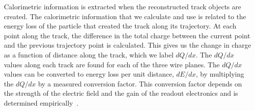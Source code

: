     Calorimetric information is extracted when the reconstructed track objects
    are created. The calorimetric information that we calculate and use is
    related to the energy loss of the particle that created the track along its
    trajectory. At each point along the track, the difference in the total
    charge between the current point and the previous trajectory point is
    calculated. This gives us the change in charge as a function of distance
    along the track, which we label $dQ/dx$. The $dQ/dx$ values along each
    track are found for each of the three wire planes. The $dQ/dx$ values can
    be converted to energy loss per unit distance, $dE/dx$, by multiplying the
    $dQ/dx$ by a measured conversion factor. This conversion factor depends on
    the strength of the electric field and the gain of the readout electronics
    and is determined empirically~\cite{uBCalibrationNote}.


